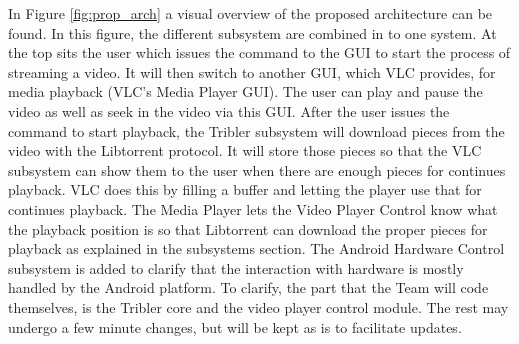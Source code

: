 In Figure \ref{fig:prop_arch} a visual overview of the proposed architecture can be found. In this figure, the different subsystem are combined in to one system. At the top sits the user which issues the command to the GUI to start the process of streaming a video. It will then switch to another GUI, which VLC provides, for media playback (VLC's Media Player GUI). The user can play and pause the video as well as seek in the video via this GUI. After the user issues the command to start playback, the Tribler subsystem will download pieces from the video with the Libtorrent protocol. It will store those pieces so that the VLC subsystem can show them to the user when there are enough pieces for continues playback. VLC does this by filling a buffer and letting the player use that for continues playback. The Media Player lets the Video Player Control know what the playback position is so that Libtorrent can download the proper pieces for playback as explained in the subsystems section. The Android Hardware Control subsystem is added to clarify that the interaction with hardware is mostly handled by the Android platform. To clarify, the part that the Team will code themselves, is the Tribler core and the video player control module. The rest may undergo a few minute changes, but will be kept as is to facilitate updates.